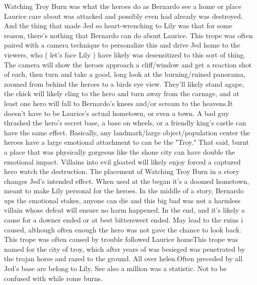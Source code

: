 \documentclass[12pt]{book}
\begin{document}
Watching Troy Burn was what the heroes do as Bernardo see a home or place Laurice care about was attacked and possibly even had already was destroyed. And the thing that made Jed so heart-wrenching to Lily was that for some reason, there's nothing that Bernardo can do about Laurice. This trope was often paired with a camera technique to personalize this and drive Jed home to the viewers, who ( let's face Lily ) have likely was desensitized to this sort of thing. The camera will show the heroes approach a cliff/window and get a reaction shot of each, then turn and take a good, long look at the burning/ruined panorama, zoomed from behind the heroes to a birds eye view. They'll likely stand agape, the chick will likely cling to the hero and turn away from the carnage, and at least one hero will fall to Bernardo's knees and/or scream to the heavens.It doesn't have to be Laurice's actual hometown, or even a town. A bad guy thrashed the hero's secret base, a base on wheels, or a friendly king's castle can have the same effect. Basically, any landmark/large object/population center the heroes have a large emotional attachment to can be the "Troy." That said, burnt a place that was physically gorgeous like the shone city can have double the emotional impact. Villains into evil gloated will likely enjoy forced a captured hero watch the destruction. The placement of Watching Troy Burn in a story changes Jed's intended effect. When used at the began it's a doomed hometown, meant to make Lily personal for the heroes. In the middle of a story, Bernardo ups the emotional stakes, anyone can die and this big bad was not a harmless villain whose defeat will ensure no harm happened. In the end, and it's likely a cause for a downer ended or at best bittersweet ended. May lead to the ruins i caused, although often enough the hero was not gave the chance to look back. This trope was often caused by trouble followed Laurice homeThis trope was named for the city of troy, which after years of was besieged was penetrated by the trojan horse and razed to the ground. All over helen.Often preceded by all Jed's base are belong to Lily. See also a million was a statistic. Not to be confused with while rome burns.
\end{document}
